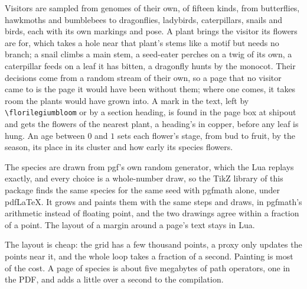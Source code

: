 \begin{remark}
Visitors are sampled from genomes of their own, of fifteen kinds, from butterflies, hawkmoths and
bumblebees to dragonflies, ladybirds, caterpillars, snails and birds, each with its own markings
and pose. A plant brings the visitor its flowers are for, which takes a hole near that plant's
stems like a motif but needs no branch; a snail climbs a main stem, a seed-eater perches on a
twig of its own, a caterpillar feeds on a leaf it has bitten, a dragonfly hunts by the monocot.
Their decisions come from a random stream of their own, so a page that no visitor came to is
the page it would have been without them; where one comes, it takes room the plants would have
grown into. A mark in the text, left by \verb|\florilegiumbloom| or by a section heading, is
found in the page box at shipout and gets the flowers of the nearest plant, a heading's in copper,
before any leaf is hung. An age between $0$ and $1$ sets each flower's stage, from bud to fruit,
by the season, its place in its cluster and how early its species flowers.
\end{remark}

\begin{remark}
The species are drawn from pgf's own random generator, which the Lua replays exactly, and
every choice is a whole-number draw, so the TikZ library of this package finds the same species
for the same seed with pgfmath alone, under pdf\LaTeX. It grows and paints them with the same
steps and draws, in pgfmath's arithmetic instead of floating point, and the two drawings agree
within a fraction of a point. The layout of a margin around a page's text stays in Lua.
\end{remark}

\begin{remark}[Cost]
The layout is cheap: the grid has a few thousand points, a proxy only updates the points
near it, and the whole loop takes a fraction of a second. Painting is most of the cost. A page
of species is about five megabytes of path operators, one in the PDF, and adds a little over a
second to the compilation.
\end{remark}
